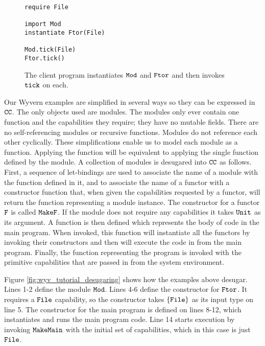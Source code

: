 \begin{figure}[h]

\begin{lstlisting}
require File

import Mod
instantiate Ftor(File)

Mod.tick(File)
Ftor.tick()
\end{lstlisting}

\caption{The client program instantiates $\mathtt{Mod}$ and $\mathtt{Ftor}$ and then invokes $\mathtt{tick}$ on each.}
\label{fig:wyv_module_instantiation}
\end{figure}

Our Wyvern examples are simplified in several ways so they can be expressed in $\mathtt{CC}$. The only objects used are modules. The modules only ever contain one function and the capabilities they require; they have no mutable fields. There are no self-referencing modules or recursive functions. Modules do not reference each other cyclically. These simplifications enable us to model each module as a function. Applying the function will be equivalent to applying the single function defined by the module. A collection of modules is desugared into $\mathtt{CC}$ as follows. First, a sequence of let-bindings are used to associate the name of a module with the function defined in it, and to associate the name of a functor with a constructor function that, when given the capabilities requested by a functor, will return the function representing a module instance. The constructor for a functor $\mathtt{F}$ is called $\mathtt{MakeF}$. If the module does not require any capabilities it takes $\mathtt{Unit}$ as its argument. A function is then defined which represents the body of code in the main program. When invoked, this function will instantiate all the functors by invoking their constructors and then will execute the code in from the main program. Finally, the function representing the program is invoked with the primitive capabilities that are passed in from the system environment.

Figure \ref{fig:wyv_tutorial_desugaring} shows how the examples above desugar. Lines 1-2 define the module $\mathtt{Mod}$.  Lines 4-6 define the constructor for $\mathtt{Ftor}$. It requires a $\mathtt{File}$ capability, so the constructor takes $\mathtt{\{File\}}$ as its input type on line 5. The constructor for the main program is defined on lines 8-12, which instantiates  and runs the main program code. Line 14 starts execution by invoking $\mathtt{MakeMain}$ with the initial set of capabilities, which in this case is just $\mathtt{File}$.

